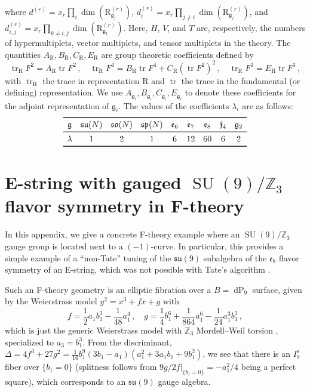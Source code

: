 \documentclass[11pt, a4paper]{article}
\newcommand*{\bbZ}{\ensuremath{\mathbb{Z}}}
\newcommand*{\fkf}{\ensuremath{\mathfrak{f}}}
\newcommand*{\fkg}{\ensuremath{\mathfrak{g}}}
\DeclareMathOperator{\SU}{SU}
\newcommand*{\fksu}{\ensuremath{\mathfrak{su}}}
\newcommand*{\fkso}{\ensuremath{\mathfrak{so}}}
\newcommand*{\fksp}{\ensuremath{\mathfrak{sp}}}
\newcommand*{\fke}{\ensuremath{\mathfrak{e}}}
\DeclareMathOperator{\trace}{tr}
\newcommand*{\irrep}[2]{\ensuremath{\bm{\mathrm{R}}_{#1}^{(#2)}}}
\newcommand*{\birrep}{\ensuremath{\bm{\mathrm{R}}}}
\begin{document}
where $d^{(r)} = x_r \prod_i \dim(\irrep{\fkg_j}{r})$, $d_i^{(r)} = x_r \prod_{j \ne i} \dim(\irrep{\fkg_j}{r})$, and $d_{i,j}^{(r)} = x_r \prod_{k \ne i, j} \dim (\irrep{\fkg_k}{r})$. Here, $H$, $V$, and $T$ are, respectively, the numbers of hypermultiplets, vector multiplets, and tensor multiplets in the theory. The quantities $A_{\birrep}, B_{\birrep}, C_{\birrep}, E_{\birrep}$ are group theoretic coefficients defined by
    \begin{equation}
        \trace_{\birrep} F^2 = A_{\birrep} \trace F^2\,, \quad \trace_{\birrep} F^4 = B_{\birrep} \trace F^4 + C_{\birrep} \left(\trace F^2\right)^2\,, \quad \trace_{\birrep} F^3 = E_{\birrep} \trace F^3\,,
    \end{equation}
with $\trace_{\birrep}$ the trace in representation $\birrep$ and $\trace$ the trace in the fundamental (or defining) representation. We use $A_{\fkg_i}, B_{\fkg_i}, C_{\fkg_i}, E_{\fkg_i}$ to denote these coefficients for the adjoint representation of $\fkg_i$.
The values of the coefficients $\lambda_i$ are as follows:
\begin{equation}
    \begin{array}{*{10}{c}} \toprule
                    \fkg & \fksu(N) & \fkso(N) & \fksp(N) & \fke_6 & \fke_7 & \fke_8 & \fkf_4 & \fkg_2 \\ \midrule
            \lambda & 1     & 2     & 1     & 6     & 12    & 60    & 6     & 2 \\ \bottomrule
        \end{array}
\end{equation}


\section{E-string with gauged \texorpdfstring{$\SU(9)/\bbZ_3$}{SU(9)/Z3} flavor symmetry in F-theory}
\label{app:su9_on_dP9}


In this appendix, we give a concrete F-theory example where an $\SU(9)/\bbZ_3$ gauge group is located next to a $(-1)$-curve.
In particular, this provides a simple example of a ``non-Tate'' tuning of the $\fksu(9)$ subalgebra of the $\fke_8$ flavor symmetry of an E-string, which was not possible with Tate's algorithm \cite{Johnson:2016qar}.


Such an F-theory geometry is an elliptic fibration over a $B=\operatorname{dP}_9$ surface, given by the Weierstrass model $y^2 = x^3 + f x + g$ with
\begin{equation}
    f = \frac12 a_1 b_1^3 - \frac{1}{48}a_1^4 \, , \quad g = \frac14 b_1^6 + \frac{1}{864} a_1^6 - \frac{1}{24} a_1^3 b_1^3 \, ,
\end{equation}
which is just the generic Weierstrass model with $\bbZ_3$ Mordell--Weil torsion \cite{Aspinwall:1998xj}, specialized to $a_3 = b_1^3$.
From the discriminant, $\Delta = 4f^3 + 27g^2 = \frac{1}{16} b_1^9 (3b_1 - a_1) (a_1^2 + 3a_1 b_1 + 9b_1^2)$, we see that there is an $I^\text{s}_9$ fiber over $\{b_1=0\}$ (splitness follows from $\left.9g/2f\right|_{\{b_1=0\}} = -a_1^2/4$ being a perfect square), which corresponds to an $\fksu(9)$ gauge algebra.
\end{document}
